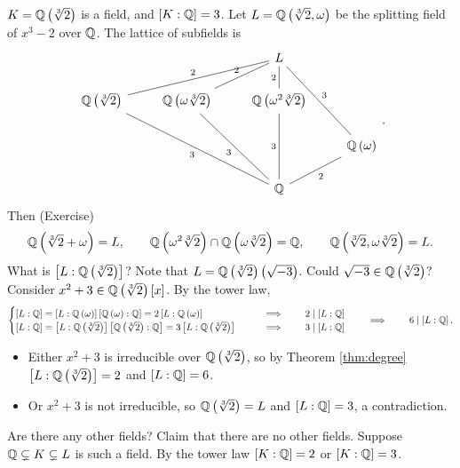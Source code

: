 $ K = \mathbb{Q}\left( \sqrt[3]{2} \right) $ is a field, and $ \left[ K : \mathbb{Q} \right] = 3 $. Let $ L = \mathbb{Q}\left( \sqrt[3]{2}, \omega \right) $ be the splitting field of $ x^3 - 2 $ over $ \mathbb{Q} $. The lattice of subfields is
$$
\begin{tikzcd}
& & L & \\
\Q\rb{\sqrt[3]{2}} \arrow[dash]{urr}{2} & \Q\rb{\omega\sqrt[3]{2}} \arrow[dash]{ur}{2} & \Q\rb{\omega^2\sqrt[3]{2}} \arrow[dash]{u}{2} & \\
& & & \Q\rb{\omega} \arrow[dash, swap]{uul}{3} \\
& & \Q \arrow[dash]{uull}{3} \arrow[dash]{uul}{3} \arrow[dash]{uu}{3} \arrow[dash, swap]{ur}{2} &
\end{tikzcd}.
$$
Then (Exercise)
$$ \mathbb{Q}\left( \sqrt[3]{2} + \omega \right) = L, \qquad \mathbb{Q}\left( \omega^2\sqrt[3]{2} \right) \cap \mathbb{Q}\left( \omega\sqrt[3]{2} \right) = \mathbb{Q}, \qquad \mathbb{Q}\left( \sqrt[3]{2}, \omega\sqrt[3]{2} \right) = L. $$
What is $ \left[ L : \mathbb{Q}\left( \sqrt[3]{2} \right) \right] $? Note that $ L = \mathbb{Q}\left( \sqrt[3]{2} \right)\left( \sqrt{-3} \right) $. Could $ \sqrt{-3} \in \mathbb{Q}\left( \sqrt[3]{2} \right) $? Consider $ x^2 + 3 \in \mathbb{Q}\left( \sqrt[3]{2} \right)\left[ x \right] $. By the tower law,
$$
\begin{cases}
\left[ L : \mathbb{Q} \right] = \left[ L : \mathbb{Q}\left( \omega \right) \right]\left[ \mathbb{Q}\left( \omega \right) : \mathbb{Q} \right] = 2\left[ L : \mathbb{Q}\left( \omega \right) \right] & \qquad \implies \qquad 2 \mid \left[ L : \mathbb{Q} \right] \\
\left[ L : \mathbb{Q} \right] = \left[ L : \mathbb{Q}\left( \sqrt[3]{2} \right) \right]\left[ \mathbb{Q}\left( \sqrt[3]{2} \right) : \mathbb{Q} \right] = 3\left[ L : \mathbb{Q}\left( \sqrt[3]{2} \right) \right] & \qquad \implies \qquad 3 \mid \left[ L : \mathbb{Q} \right]
\end{cases}
\qquad \implies \qquad 6 \mid \left[ L : \mathbb{Q} \right].
$$
\begin{itemize}
\item Either $ x^2 + 3 $ is irreducible over $ \mathbb{Q}\left( \sqrt[3]{2} \right) $, so by Theorem \ref{thm:degree} $ \left[ L : \mathbb{Q}\left( \sqrt[3]{2} \right) \right] = 2 $ and $ \left[ L : \mathbb{Q} \right] = 6 $.
\item Or $ x^2 + 3 $ is not irreducible, so $ \mathbb{Q}\left( \sqrt[3]{2} \right) = L $ and $ \left[ L : \mathbb{Q} \right] = 3 $, a contradiction.
\end{itemize}
Are there any other fields? Claim that there are no other fields. Suppose $ \mathbb{Q} \subsetneq K \subsetneq L $ is such a field. By the tower law $ \left[ K : \mathbb{Q} \right] = 2 $ or $ \left[ K : \mathbb{Q} \right] = 3 $.
